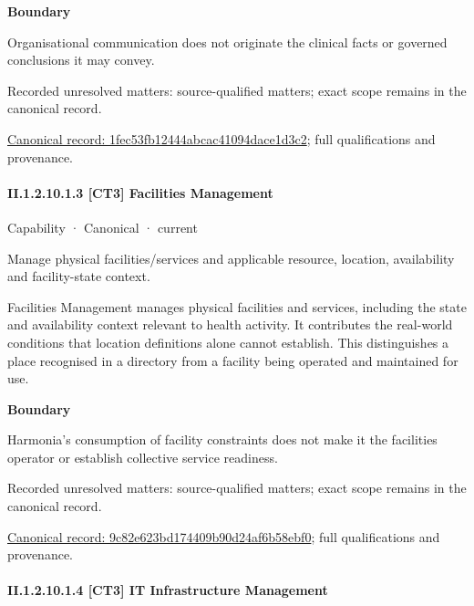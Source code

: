 \textbf{Boundary}



Organisational communication does not originate the clinical facts or governed conclusions it may convey.


{\small Recorded unresolved matters: source-qualified matters; exact scope remains in the canonical record.}\par
{\footnotesize \href{../../../../continuum/strategy/capability/1fec53fb12444abcac41094dace1d3c2.md}{Canonical record: 1fec53fb12444abcac41094dace1d3c2}; full qualifications and provenance.}\par
\paragraph*{II.1.2.10.1.3 [CT3] Facilities Management}
\label{navigation:II.1.2.10.1.3}

\label{element:9c82e623bd174409b90d24af6b58ebf0}
{\small Capability · Canonical · current}\par

Manage physical facilities/services and applicable resource, location, availability and facility-state context.



Facilities Management manages physical facilities and services, including the state and availability context relevant to health activity. It contributes the real-world conditions that location definitions alone cannot establish. This distinguishes a place recognised in a directory from a facility being operated and maintained for use.



\textbf{Boundary}



Harmonia's consumption of facility constraints does not make it the facilities operator or establish collective service readiness.


{\small Recorded unresolved matters: source-qualified matters; exact scope remains in the canonical record.}\par
{\footnotesize \href{../../../../continuum/strategy/capability/9c82e623bd174409b90d24af6b58ebf0.md}{Canonical record: 9c82e623bd174409b90d24af6b58ebf0}; full qualifications and provenance.}\par
\paragraph*{II.1.2.10.1.4 [CT3] IT Infrastructure Management}
\label{navigation:II.1.2.10.1.4}

